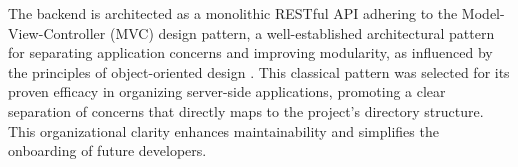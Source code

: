 The backend is architected as a monolithic RESTful API adhering to the Model-View-Controller (MVC) design pattern, a well-established architectural pattern for separating application concerns and improving modularity, as influenced by the principles of object-oriented design \cite{Gamma1995DesignPatterns}. This classical pattern was selected for its proven efficacy in organizing server-side applications, promoting a clear separation of concerns that directly maps to the project's directory structure. This organizational clarity enhances maintainability and simplifies the onboarding of future developers.

\textgap



